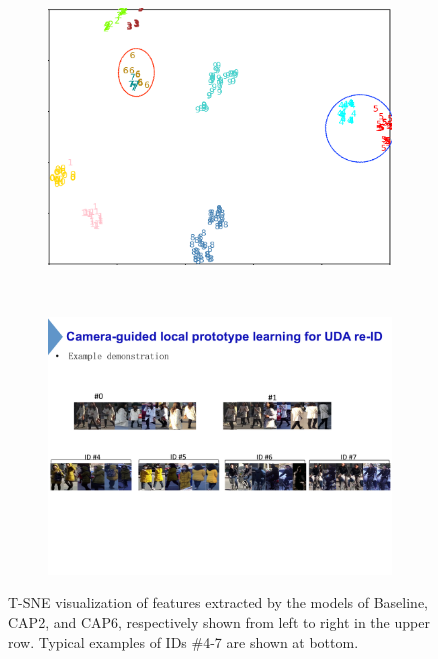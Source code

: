 \documentclass[letterpaper]{article} %
\begin{document}
\begin{figure}[t]
\begin{subfigure}{0.29\textwidth}
\end{subfigure}
\quad
\begin{subfigure}{0.29\textwidth}
\centering
\includegraphics[width=1.0\textwidth]{./model_v10_full.png}
\end{subfigure}
\\
\begin{subfigure}{0.9\textwidth}
\centering
\includegraphics[width=1.0\textwidth]{./msmt_tsne_examples}
\end{subfigure}
\caption{T-SNE visualization of features extracted by the models of Baseline, CAP2, and CAP6, respectively shown from left to right in the upper row. Typical examples of IDs \#4-7 are shown at bottom.}
\label{fig_compare_tsne}
\end{figure}
\end{document}
